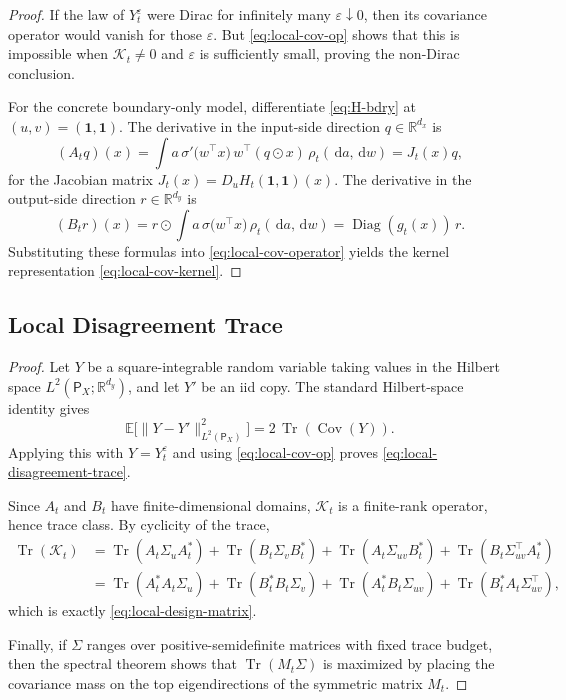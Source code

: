 \documentclass[11pt]{article}
\theoremstyle{definition}
\newcommand{\R}{\mathbb{R}}
\newcommand{\E}{\mathbb{E}}
\newcommand{\dd}{\,\mathrm{d}}
\begin{document}
\begin{proof}
If the law of $Y_t^\varepsilon$ were Dirac for infinitely many
$\varepsilon\downarrow 0$, then its covariance operator would vanish for those
$\varepsilon$. But \eqref{eq:local-cov-op} shows that this is impossible when
$\mathcal K_t\neq 0$ and $\varepsilon$ is sufficiently small, proving the
non-Dirac conclusion.

For the concrete boundary-only model, differentiate \eqref{eq:H-bdry} at
$(u,v)=(\mathbf 1,\mathbf 1)$. The derivative in the input-side direction
$q\in\R^{d_x}$ is
\[
  (A_t q)(x)
  =
  \int
  a\,\sigma'\!\bigl(w^\top x\bigr)\,
  w^\top(q\odot x)\,\rho_t(\dd a,\dd w)
  =
  J_t(x)q,
\]
for the Jacobian matrix $J_t(x)=D_u H_t(\mathbf 1,\mathbf 1)(x)$. The
derivative in the output-side direction $r\in\R^{d_y}$ is
\[
  (B_t r)(x)
  =
  r\odot
  \int a\,\sigma\!\bigl(w^\top x\bigr)\,\rho_t(\dd a,\dd w)
  =
  \operatorname{Diag}(g_t(x))\,r.
\]
Substituting these formulas into \eqref{eq:local-cov-operator} yields the kernel
representation \eqref{eq:local-cov-kernel}.
\end{proof}

\subsection{Local Disagreement Trace}

\begin{proof}
Let $Y$ be a square-integrable random variable taking values in the Hilbert
space $L^2(\mathsf P_X;\R^{d_y})$, and let $Y'$ be an iid copy. The standard
Hilbert-space identity gives
\[
  \E\bigl[\|Y-Y'\|_{L^2(\mathsf P_X)}^2\bigr]
  =
  2\,\operatorname{Tr}(\operatorname{Cov}(Y)).
\]
Applying this with $Y=Y_t^\varepsilon$ and using
\eqref{eq:local-cov-op} proves \eqref{eq:local-disagreement-trace}.

Since $A_t$ and $B_t$ have finite-dimensional domains, $\mathcal K_t$ is a
finite-rank operator, hence trace class. By cyclicity of the trace,
\begin{align*}
  \operatorname{Tr}(\mathcal K_t)
  &=
  \operatorname{Tr}(A_t\Sigma_u A_t^*)
  +
  \operatorname{Tr}(B_t\Sigma_v B_t^*)
  +
  \operatorname{Tr}(A_t\Sigma_{uv} B_t^*)
  +
  \operatorname{Tr}(B_t\Sigma_{uv}^\top A_t^*)\\
  &=
  \operatorname{Tr}(A_t^*A_t\Sigma_u)
  +
  \operatorname{Tr}(B_t^*B_t\Sigma_v)
  +
  \operatorname{Tr}(A_t^*B_t\Sigma_{uv})
  +
  \operatorname{Tr}(B_t^*A_t\Sigma_{uv}^\top),
\end{align*}
which is exactly \eqref{eq:local-design-matrix}.

Finally, if $\Sigma$ ranges over positive-semidefinite matrices with fixed trace
budget, then the spectral theorem shows that
\(
  \operatorname{Tr}(M_t\Sigma)
\)
is maximized by placing the covariance mass on the top eigendirections of the
symmetric matrix $M_t$.
\end{proof}
\end{document}

